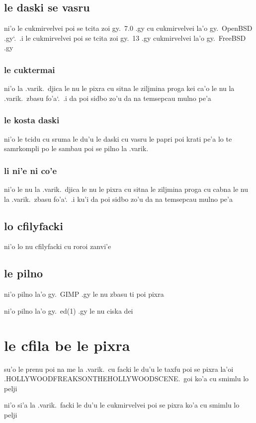 \documentclass{report}
\newcommand\sds{\spacefactor\sfcode`.\ \space}
\begin{document}
\subsection{le daski se vasru}
ni'o le cukmirvelvei poi se tcita zoi gy.\ 7.0 .gy cu cukmirvelvei la'o gy.\ OpenBSD .gy\sds  .i le cukmirvelvei poi se tcita zoi gy.\ 13 .gy cukmirvelvei la'o gy.\ FreeBSD .gy

\subsubsection{le cuktermai}
ni'o la .varik.\ djica le nu le pixra cu sitna le ziljmina proga kei ca'o le nu la .varik.\ zbasu fo'a\sds  .i da poi sidbo zo'u da na temsepcau mulno pe'a

\subsubsection{le kosta daski}
ni'o le tcidu cu sruma le du'u le daski cu vasru le papri poi krati pe'a lo te samrkompli po le sambau poi se pilno la .varik.

\subsubsection{li ni'e ni co'e}
ni'o le nu la .varik.\ djica le nu le pixra cu sitna le ziljmina proga cu cabna le nu la .varik.\ zbasu fo'a\sds  .i ku'i da poi sidbo zo'u da na temsepcau mulno pe'a

\subsection{lo cfilyfacki}
ni'o lo nu cfilyfacki cu roroi zanvi'e

\subsection{le pilno}
ni'o pilno la'o gy.\ GIMP .gy le nu zbasu ti poi pixra

ni'o pilno la'o gy.\ ed(1) .gy le nu ciska dei

\section{le cfila be le pixra}
su'o le prenu poi na me la .varik.\ cu facki le du'u le taxfu poi se pixra la'oi .HOLLYWOODFREAKSONTHEHOLLYWOODSCENE.\ goi ko'a cu smimlu lo pelji

ni'o si'a la .varik.\ facki le du'u le cukmirvelvei poi se pixra ko'a cu smimlu lo pelji
\end{document}
